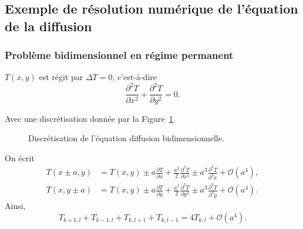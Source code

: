     \subsection{Exemple de résolution numérique de l'équation de la diffusion}
        \subsubsection{Problème bidimensionnel en régime permanent}
            $T(x,y)$ est régit par $\Delta T=0$, c'est-à-dire
            \begin{equation}
                \frac{\partial^{2}T}{\partial x^{2}}+\frac{\partial^{2}T}{\partial y^{2}}=0.
            \end{equation}

            Avec une discrétisation donnée par la Figure~\ref{fig:discretisation_equation_diffusion_bidimensionnelle}.

            \begin{figure}
                \centering
                \caption{Discrétisation de l'équation diffusion bidimensionnelle.}    
                \label{fig:discretisation_equation_diffusion_bidimensionnelle}
            \end{figure}

            On écrit 
            \begin{equation}
                \begin{aligned}
                    T(x\pm a,y)
                    &=T(x,y)\pm a\frac{\partial T}{\partial x}+\frac{a^{2}}{2}\frac{\partial^{2}T}{\partial x^{2}}\pm a^{3}\frac{\partial^{3} T}{\partial^{3}x}+\mathcal{O}(a^{4}),\\
                    T(x,y\pm a)
                    &=T(x,y)\pm a\frac{\partial T}{\partial y}+\frac{a^{2}}{2}\frac{\partial^{2}T}{\partial y^{2}}\pm a^{3}\frac{\partial^{3} T}{\partial^{3} y}+\mathcal{O}(a^{4}).
                \end{aligned}
            \end{equation}
            Ainsi,
            \begin{equation}
                \boxed{
                    T_{k+1,l}+T_{k-1,l}+T_{k,l+1}+T_{k,l-1}=4T_{k,l}+\mathcal{O}(a^{4}).
                }
            \end{equation}